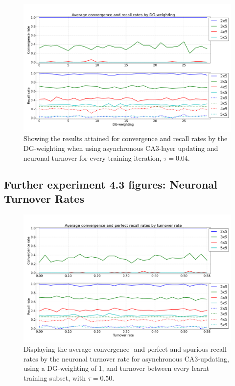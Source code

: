 \begin{figure}
    \centering
    \includegraphics[width=13cm]{fig/DGWs/async_tm1_04}
    \caption{Showing the results attained for convergence and recall rates by the DG-weighting when using asynchronous CA3-layer updating and neuronal turnover for every training iteration, $\tau=0.04$.}
    \label{fig:async_tm1_04}
\end{figure}

\subsection*{Further experiment 4.3 figures: Neuronal Turnover Rates}

\begin{figure}
    \centering
    \includegraphics[width=13cm]{fig/turnover_rates/async_tm0_dgw25}
    \caption{Displaying the average convergence- and perfect and spurious recall rates by the neuronal turnover rate for asynchronous CA3-updating, using a DG-weighting of 1, and turnover between every learnt training subset, with $\tau=0.50$.}
    \label{fig:async_tm0_dgw25}
\end{figure}


